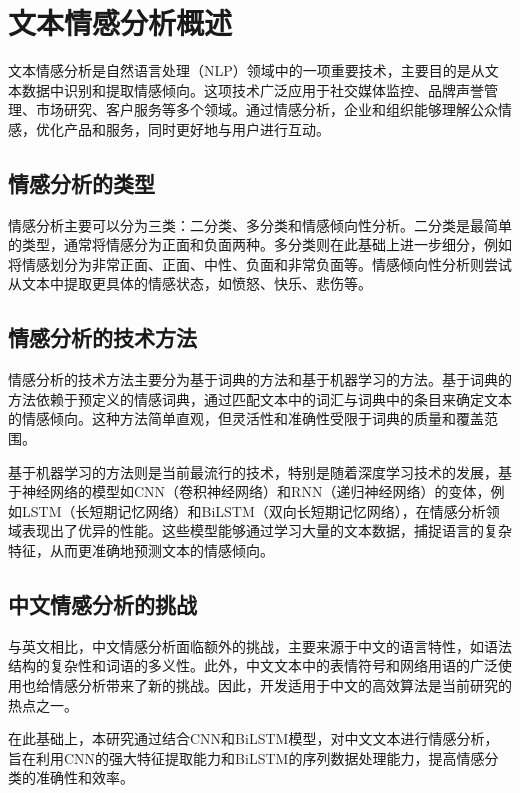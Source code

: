 \section{文本情感分析概述}
文本情感分析是自然语言处理（NLP）领域中的一项重要技术，主要目的是从文本数据中识别和提取情感倾向。这项技术广泛应用于社交媒体监控、品牌声誉管理、市场研究、客户服务等多个领域。通过情感分析，企业和组织能够理解公众情感，优化产品和服务，同时更好地与用户进行互动。
\subsection{情感分析的类型}
情感分析主要可以分为三类：二分类、多分类和情感倾向性分析。二分类是最简单的类型，通常将情感分为正面和负面两种。多分类则在此基础上进一步细分，例如将情感划分为非常正面、正面、中性、负面和非常负面等。情感倾向性分析则尝试从文本中提取更具体的情感状态，如愤怒、快乐、悲伤等。
\subsection{情感分析的技术方法}
情感分析的技术方法主要分为基于词典的方法和基于机器学习的方法。基于词典的方法依赖于预定义的情感词典，通过匹配文本中的词汇与词典中的条目来确定文本的情感倾向。这种方法简单直观，但灵活性和准确性受限于词典的质量和覆盖范围。

基于机器学习的方法则是当前最流行的技术，特别是随着深度学习技术的发展，基于神经网络的模型如CNN（卷积神经网络）和RNN（递归神经网络）的变体，例如LSTM（长短期记忆网络）和BiLSTM（双向长短期记忆网络），在情感分析领域表现出了优异的性能。这些模型能够通过学习大量的文本数据，捕捉语言的复杂特征，从而更准确地预测文本的情感倾向。
\subsection{中文情感分析的挑战}
与英文相比，中文情感分析面临额外的挑战，主要来源于中文的语言特性，如语法结构的复杂性和词语的多义性。此外，中文文本中的表情符号和网络用语的广泛使用也给情感分析带来了新的挑战。因此，开发适用于中文的高效算法是当前研究的热点之一。

在此基础上，本研究通过结合CNN和BiLSTM模型，对中文文本进行情感分析，旨在利用CNN的强大特征提取能力和BiLSTM的序列数据处理能力，提高情感分类的准确性和效率。
